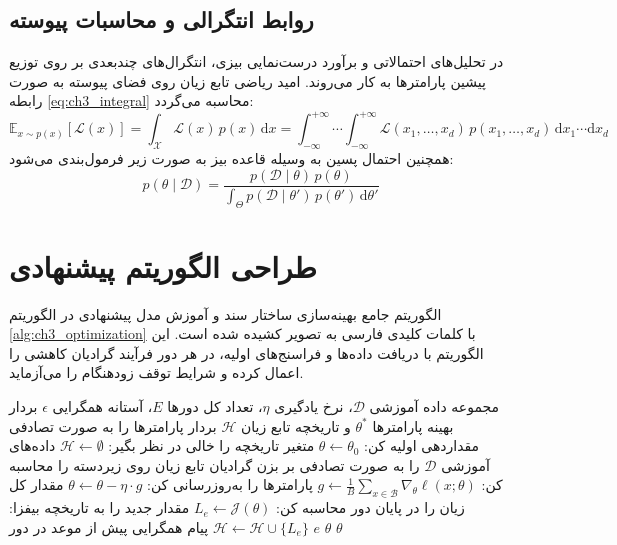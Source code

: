 \subsection{روابط انتگرالی و محاسبات پیوسته}
در تحلیل‌های احتمالاتی و برآورد درست‌نمایی بیزی، انتگرال‌های چندبعدی بر روی توزیع پیشین پارامترها به کار می‌روند. امید ریاضی تابع زیان روی فضای پیوسته به صورت رابطه \eqref{eq:ch3_integral} محاسبه می‌گردد:
\begin{equation}
\label{eq:ch3_integral}
\mathbb{E}_{x \sim p(x)}\left[\mathcal{L}(x)\right] = \int_{\mathcal{X}} \mathcal{L}(x) \, p(x) \, \mathrm{d}x = \int_{-\infty}^{+\infty} \cdots \int_{-\infty}^{+\infty} \mathcal{L}(x_1, \dots, x_d) \, p(x_1, \dots, x_d) \, \mathrm{d}x_1 \cdots \mathrm{d}x_d
\end{equation}
همچنین احتمال پسین به وسیله قاعده بیز به صورت زیر فرمول‌بندی می‌شود:
\begin{equation}
\label{eq:ch3_bayes}
p(\theta \mid \mathcal{D}) = \frac{p(\mathcal{D} \mid \theta) \, p(\theta)}{\int_{\Theta} p(\mathcal{D} \mid \theta') \, p(\theta') \, \mathrm{d}\theta'}
\end{equation}

\section{طراحی الگوریتم پیشنهادی}
\label{sec:ch3_algorithm}

الگوریتم جامع بهینه‌سازی ساختار سند و آموزش مدل پیشنهادی در الگوریتم \ref{alg:ch3_optimization} با کلمات کلیدی فارسی به تصویر کشیده شده است. این الگوریتم با دریافت داده‌ها و فراسنج‌های اولیه، در هر دور فرآیند گرادیان کاهشی را اعمال کرده و شرایط توقف زودهنگام را می‌آزماید.

\begin{algorithm}[htbp]
\caption{آموزش و بهینه‌سازی پارامترهای مدل پیشنهادی}
\label{alg:ch3_optimization}
\begin{algorithmic}[1]
\REQUIRE مجموعه داده آموزشی $\mathcal{D}$، نرخ یادگیری $\eta$، تعداد کل دورها $E$، آستانه همگرایی $\epsilon$
\ENSURE بردار بهینه پارامترها $\theta^*$ و تاریخچه تابع زیان $\mathcal{H}$
\STATE بردار پارامترها را به صورت تصادفی مقداردهی اولیه کن: $\theta \leftarrow \theta_0$
\STATE متغیر تاریخچه را خالی در نظر بگیر: $\mathcal{H} \leftarrow \emptyset$
  \STATE داده‌های آموزشی $\mathcal{D}$ را به صورت تصادفی بر بزن
    \STATE گرادیان تابع زیان روی زیردسته را محاسبه کن: $g \leftarrow \frac{1}{B} \sum_{x \in \mathcal{B}} \nabla_\theta \ell(x; \theta)$
    \STATE پارامترها را به‌روزرسانی کن: $\theta \leftarrow \theta - \eta \cdot g$
  \ENDFOR
  \STATE مقدار کل زیان را در پایان دور محاسبه کن: $L_e \leftarrow \mathcal{J}(\theta)$
  \STATE مقدار جدید را به تاریخچه بیفزا: $\mathcal{H} \leftarrow \mathcal{H} \cup \{L_e\}$
    \PRINT پیام همگرایی پیش از موعد در دور $e$
    \RETURN $\theta$
  \ENDIF
\ENDFOR
\RETURN $\theta$
\end{algorithmic}
\end{algorithm}

